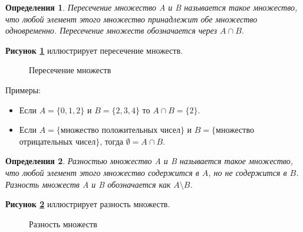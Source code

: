 \documentclass[a4paper, 16pt, oneside]{book}
\newtheorem{Definition}{Определения}[theorem]
\begin{document}
\begin{Definition}
    \label{definiton:intersection}
    Пересечение множество A и B называется такое множество, что любой элемент этого множество принадлежит обе множество одновременно.
    Пересечение множеств обозначается через \(A \cap B\).
\end{Definition}

\par \textbf{Рисунок \ref{picture:set:intersection}} иллюстрирует пересечение множеств.
\begin{figure}
    \centering
    \caption{Пересечение множеств}
    \label{picture:set:intersection}
\end{figure}

\par Примеры:
\begin{itemize}
    \item Если \(A = \{0, 1, 2\}\) и \(B = \{2, 3, 4\}\) то \(A \cap B = \{2\}\).
    \item Если \(A = \{\)множество положительных чисел\(\}\) и \(B = \{\)множество отрицательных чисел\(\}\), тогда \(\emptyset = A \cap B\).
\end{itemize}

\begin{Definition}
    \label{definiton:difference}
    Разностью множество A и B называется такое множество, что любой элемент этого множество содержится в \(A\), но не содержится в \(B\).
    Разность множеств A и B обозначается как \(A \setminus B\).
\end{Definition}

\par \textbf{Рисунок \ref{picture:set:difference}} иллюстрирует разность множеств.
\begin{figure}
    \centering
    \caption{Разность множеств}
    \label{picture:set:difference}
\end{figure}
\end{document}
